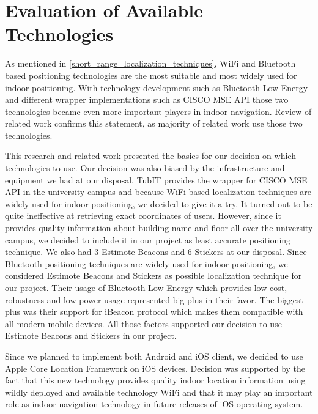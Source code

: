 \section{Evaluation of Available Technologies}
As mentioned in \ref{short_range_localization_techniques}, WiFi and Bluetooth based positioning technologies are the most suitable and most widely used for indoor positioning. With technology development such as Bluetooth Low Energy and different wrapper implementations such as CISCO MSE API those two technologies became even more important players in indoor navigation. Review of related work confirms this statement, as majority of related work use those two technologies.

This research and related work presented the basics for our decision on which technologies to use. Our decision was also biased by the infrastructure and equipment we had at our disposal. TubIT provides the wrapper for CISCO MSE API in the university campus and because WiFi based localization techniques are widely used for indoor positioning, we decided to give it a try. It turned out to be quite ineffective at retrieving exact coordinates of users. However, since it provides quality information about building name and floor all over the university campus, we decided to include it in our project as least accurate positioning technique. We also had 3 Estimote Beacons and 6 Stickers at our disposal. Since Bluetooth positioning techniques are widely used for indoor positioning, we considered Estimote Beacons and Stickers as possible localization technique for our project. Their usage of Bluetooth Low Energy which provides low cost, robustness and low power usage represented big plus in their favor. The biggest plus was their support for iBeacon protocol which makes them compatible with all modern mobile devices. All those factors supported our decision to use Estimote Beacons and Stickers in our project.

Since we planned to implement both Android and iOS client, we decided to use Apple Core Location Framework on iOS devices. Decision was supported by the fact that this new technology provides quality indoor location information using wildly deployed and available technology WiFi and that it may play an important role as indoor navigation technology in future releases of iOS operating system.